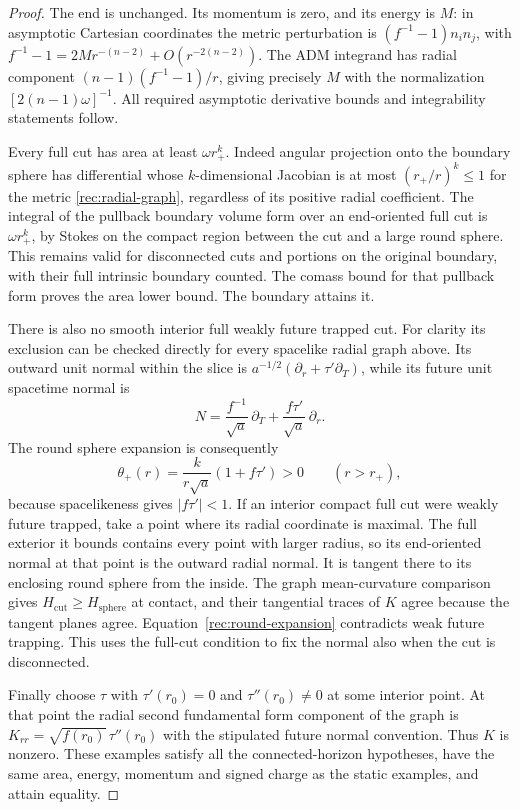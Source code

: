 \begin{proof}
The end is unchanged. Its momentum is zero, and its energy is
$M$: in asymptotic Cartesian coordinates the metric perturbation
is $(f^{-1}-1)n_i n_j$, with
$f^{-1}-1=2Mr^{-(n-2)}+O(r^{-2(n-2)})$. The ADM integrand has
radial component $(n-1)(f^{-1}-1)/r$, giving precisely $M$
with the normalization $[2(n-1)\omega]^{-1}$. All required
asymptotic derivative bounds and integrability statements follow.

Every full cut has area at least $\omega r_+^k$. Indeed angular
projection onto the boundary sphere has differential whose
$k$-dimensional Jacobian is at most $(r_+/r)^k\leq1$ for the
metric \eqref{rec:radial-graph}, regardless of its positive radial
coefficient. The integral of the pullback boundary volume form
over an end-oriented full cut is $\omega r_+^k$, by Stokes on
the compact region between the cut and a large round sphere.
This remains valid for disconnected cuts and portions on the
original boundary, with their full intrinsic boundary counted.
The comass bound for that pullback form proves the area lower
bound. The boundary attains it.

There is also no smooth interior full weakly future trapped cut.
For clarity its exclusion can be checked directly for every
spacelike radial graph above. Its outward unit normal within the
slice is $a^{-1/2}(\partial_r+\tau'\partial_T)$, while its future
unit spacetime normal is
\[
 N=\frac{f^{-1}}{\sqrt a}\,\partial_T
       +\frac{f\tau'}{\sqrt a}\,\partial_r.
\]
The round sphere expansion is consequently
\begin{equation}\label{rec:round-expansion}
 \theta_+(r)=\frac{k}{r\sqrt a}(1+f\tau')>0
 \qquad(r>r_+),
\end{equation}
because spacelikeness gives $|f\tau'|<1$. If an interior compact
full cut were weakly future trapped, take a point where its radial
coordinate is maximal. The full exterior it bounds contains every
point with larger radius, so its end-oriented normal at that point
is the outward radial normal. It is tangent there to its enclosing
round sphere from the inside. The graph mean-curvature comparison
gives $H_{\mathrm{cut}}\geq H_{\mathrm{sphere}}$ at contact,
and their tangential traces of $K$ agree because the tangent
planes agree. Equation~\eqref{rec:round-expansion} contradicts
weak future trapping. This uses the full-cut condition to fix the
normal also when the cut is disconnected.

Finally choose $\tau$ with $\tau'(r_0)=0$ and
$\tau''(r_0)\ne0$ at some interior point. At that point the
radial second fundamental form component of the graph is
$K_{rr}=\sqrt{f(r_0)}\,\tau''(r_0)$ with the stipulated future
normal convention. Thus $K$ is nonzero. These examples satisfy
all the connected-horizon hypotheses, have the same area, energy,
momentum and signed charge as the static examples, and attain
equality.
\end{proof}


